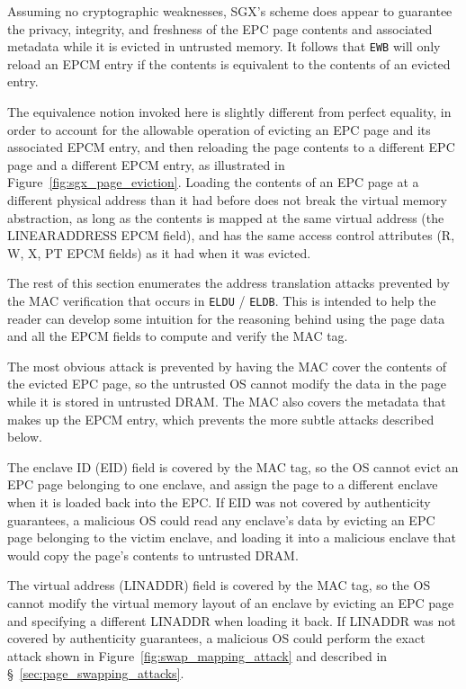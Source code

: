 Assuming no cryptographic weaknesses, SGX's scheme does appear to guarantee the
privacy, integrity, and freshness of the EPC page contents and associated
metadata while it is evicted in untrusted memory. It follows that \texttt{EWB}
will only reload an EPCM entry if the contents is equivalent to the contents of
an evicted entry.

The equivalence notion invoked here is slightly different from perfect
equality, in order to account for the allowable operation of evicting an EPC
page and its associated EPCM entry, and then reloading the page contents to a
different EPC page and a different EPCM entry, as illustrated in
Figure~\ref{fig:sgx_page_eviction}. Loading the contents of an EPC page at a
different physical address than it had before does not break the virtual memory
abstraction, as long as the contents is mapped at the same virtual address
(the LINEARADDRESS EPCM field), and has the same access control attributes
(R, W, X, PT EPCM fields) as it had when it was evicted.

The rest of this section enumerates the address translation attacks prevented
by the MAC verification that occurs in \texttt{ELDU} / \texttt{ELDB}. This is
intended to help the reader can develop some intuition for the reasoning behind
using the page data and all the EPCM fields to compute and verify the MAC tag.

The most obvious attack is prevented by having the MAC cover the contents of
the evicted EPC page, so the untrusted OS cannot modify the data in the page
while it is stored in untrusted DRAM. The MAC also covers the metadata that
makes up the EPCM entry, which prevents the more subtle attacks described
below.

The enclave ID (EID) field is covered by the MAC tag, so the OS cannot evict an
EPC page belonging to one enclave, and assign the page to a different enclave
when it is loaded back into the EPC. If EID was not covered by authenticity
guarantees, a malicious OS could read any enclave's data by evicting an EPC
page belonging to the victim enclave, and loading it into a malicious enclave
that would copy the page's contents to untrusted DRAM.

The virtual address (LINADDR) field is covered by the MAC tag, so the OS cannot
modify the virtual memory layout of an enclave by evicting an EPC page and
specifying a different LINADDR when loading it back. If LINADDR was not covered
by authenticity guarantees, a malicious OS could perform the exact attack shown
in Figure~\ref{fig:swap_mapping_attack} and described in
\S~\ref{sec:page_swapping_attacks}.

